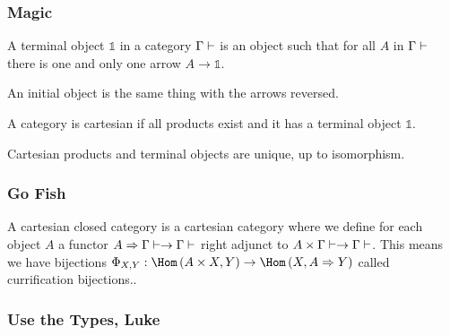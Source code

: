 \documentclass[math, english, info, noamsthm]{beamercours}
\begin{document}
\begin{frame}
	\frametitle{Magic}
	\begin{definition}
		A terminal object $\mathds{1}$ in a category $\Gamma\vdash$ is an object such that for all $A$ in $\Gamma\vdash$ there is one and only one arrow $A \to \mathds{1}$.
	\end{definition}
	An initial object is the same thing with the arrows reversed.
	\begin{definition}
		A category is cartesian if all products exist and it has a terminal object $\mathds{1}$.
	\end{definition}
	Cartesian products and terminal objects are unique, up to isomorphism.
\end{frame}

\begin{frame}[fragile]
	\frametitle{Go Fish}
	\begin{definition}
		A cartesian closed category is a cartesian category where we define for each object $A$ a functor $A \Rightarrow \Gamma\vdash \to \Gamma\vdash$ right adjunct to $A \times \Gamma\vdash \to \Gamma\vdash$.
		This means we have bijections $\Phi_{X, Y}: \Hom\left( A \times X, Y \right) \to \Hom\left( X, A \Rightarrow Y \right)$ called currification bijections..
	\end{definition}
\end{frame}

\begin{frame}
	\frametitle{Use the Types, Luke}
\end{frame}
\end{document}

